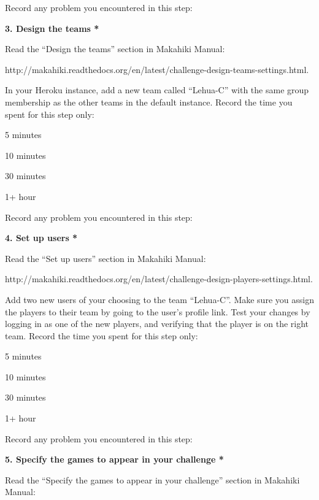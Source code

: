 Record any problem you encountered in this step: \underline{\hspace{4cm}}

{\bf 3. Design the teams *}

Read the ``Design the teams'' section in Makahiki Manual:

http://makahiki.readthedocs.org/en/latest/challenge-design-teams-settings.html. 

In your Heroku instance, add a new team called ``Lehua-C'' with the same group membership as the other teams in the default instance. Record the time you spent for this step only:

\begin{radiobutton}
\item 5 minutes
\item  10 minutes
\item  30 minutes
\item  1+ hour
\end{radiobutton}


Record any problem you encountered in this step: \underline{\hspace{4cm}}

{\bf 4. Set up users *}

Read the ``Set up users'' section in Makahiki Manual:

http://makahiki.readthedocs.org/en/latest/challenge-design-players-settings.html. 

Add two new users of your choosing to the team ``Lehua-C''. Make sure you assign the players to their team by going to the user's profile link. Test your changes by logging in as one of the new players, and verifying that the player is on the right team. Record the time you spent for this step only:

\begin{radiobutton}
\item 5 minutes
\item  10 minutes
\item  30 minutes
\item  1+ hour
\end{radiobutton}


Record any problem you encountered in this step: \underline{\hspace{4cm}}

{\bf 5. Specify the games to appear in your challenge *}

Read the ``Specify the games to appear in your challenge'' section in Makahiki Manual:

